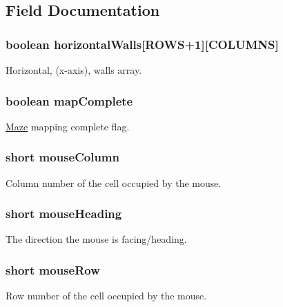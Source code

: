 \subsection{Field Documentation}
\hypertarget{struct_maze_a5e6e52f4614a45d6f0ab0f43af9b8291}{}
\subsubsection[{horizontal\+Walls}]{\setlength{\rightskip}{0pt plus 5cm}boolean horizontal\+Walls\mbox{[}R\+O\+W\+S+1\mbox{]}\mbox{[}C\+O\+L\+U\+M\+N\+S\mbox{]}}\label{struct_maze_a5e6e52f4614a45d6f0ab0f43af9b8291}
Horizontal, (x-\/axis), walls array. \hypertarget{struct_maze_ac252030149db173cf7a0e623f7d1552a}{}
\subsubsection[{map\+Complete}]{\setlength{\rightskip}{0pt plus 5cm}boolean map\+Complete}\label{struct_maze_ac252030149db173cf7a0e623f7d1552a}
\hyperlink{struct_maze}{Maze} mapping complete flag. \hypertarget{struct_maze_aff431e9c6fe8a138320e2b32f8160ae7}{}
\subsubsection[{mouse\+Column}]{\setlength{\rightskip}{0pt plus 5cm}short mouse\+Column}\label{struct_maze_aff431e9c6fe8a138320e2b32f8160ae7}
Column number of the cell occupied by the mouse. \hypertarget{struct_maze_a06eb34bb9132c0dc618cbea56484e4f9}{}
\subsubsection[{mouse\+Heading}]{\setlength{\rightskip}{0pt plus 5cm}short mouse\+Heading}\label{struct_maze_a06eb34bb9132c0dc618cbea56484e4f9}
The direction the mouse is facing/heading. \hypertarget{struct_maze_a25fbdad541be1fc5c7d6f24cd5affb32}{}
\subsubsection[{mouse\+Row}]{\setlength{\rightskip}{0pt plus 5cm}short mouse\+Row}\label{struct_maze_a25fbdad541be1fc5c7d6f24cd5affb32}
Row number of the cell occupied by the mouse. \hypertarget{struct_maze_a9766593afcd1e7190fa595580d22c361}{}
